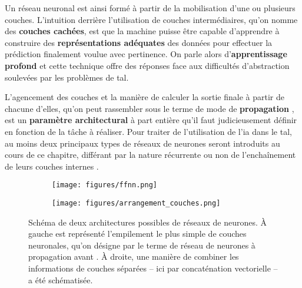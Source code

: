 \documentclass[12pt, twoside]{report}
\begin{document}
Un réseau neuronal est ainsi formé à partir de la mobilisation d'une ou plusieurs couches. L'intuition derrière l'utilisation de couches intermédiaires, qu'on nomme des \textbf{couches cachées}, est que la machine puisse être capable d'apprendre à construire des \textbf{représentations adéquates} des données pour effectuer la prédiction finalement voulue avec pertinence. On parle alors d'\textbf{apprentissage profond} et cette technique offre des réponses face aux difficultés d'abstraction soulevées par les problèmes de \Gls{tal}.

L'agencement des couches et la manière de calculer la sortie finale à partir de chacune d'elles, qu'on peut rassembler sous le terme de \og mode de \textbf{propagation} \fg, est un \textbf{paramètre architectural} à part entière qu'il faut judicieusement définir en fonction de la tâche à réaliser. Pour traiter de l'utilisation de l'\Gls{ia} dans le \Gls{tal}, au moins deux principaux types de réseaux de neurones seront introduits au cours de ce chapitre, différant par la nature récurrente ou non de l'enchaînement de leurs couches internes \autocite[chap.~7]{jurafsky}.

\begin{figure}[!h]
    \centering
    \begin{subfigure}[b]{0.5\textwidth}
        \texttt{[image: figures/ffnn.png]}
    \end{subfigure}\hspace{0,5cm}
    \begin{subfigure}[b]{0.4\textwidth}
        \texttt{[image: figures/arrangement\_couches.png]}
    \end{subfigure}
    \caption{Schéma de deux architectures possibles de réseaux de neurones. À gauche est représenté l'empilement le plus simple de couches neuronales, qu'on désigne par le terme de \og{} réseau de neurones à propagation avant \fg{}. À droite, une manière de combiner les informations de couches séparées -- ici par concaténation vectorielle -- a été schématisée.}
\end{figure}

\end{document}
